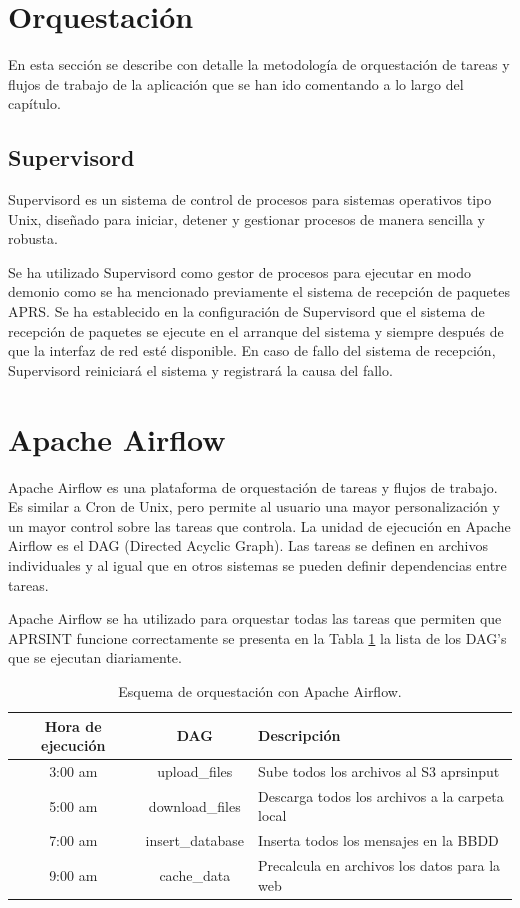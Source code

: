 \section{Orquestación}

En esta sección se describe con detalle la metodología de orquestación de tareas y flujos de trabajo de la aplicación que se han ido comentando a lo largo del capítulo.

\subsection{Supervisord}
Supervisord es un sistema de control de procesos para sistemas operativos tipo Unix, diseñado para iniciar, detener y gestionar procesos de manera sencilla y robusta.

Se ha utilizado Supervisord como gestor de procesos para ejecutar en modo demonio como se ha mencionado previamente el sistema de recepción de paquetes APRS. Se ha establecido en la configuración de Supervisord que el sistema de recepción de paquetes se ejecute en el arranque del sistema y siempre después de que la interfaz de red esté disponible. En caso de fallo del sistema de recepción, Supervisord reiniciará el sistema y registrará la causa del fallo.

\section{Apache Airflow}
Apache Airflow es una plataforma de orquestación de tareas y flujos de trabajo. Es similar a Cron de Unix, pero permite al usuario una mayor personalización y un mayor control sobre las tareas que controla. La unidad de ejecución en Apache Airflow es el DAG (Directed Acyclic Graph). Las tareas se definen en archivos individuales y al igual que en otros sistemas se pueden definir dependencias entre tareas.

Apache Airflow se ha utilizado para orquestar todas las tareas que permiten que APRSINT funcione correctamente se presenta en la Tabla \ref{tab:airflow-sched} la lista de los DAG's que se ejecutan diariamente.

\begin{table}[htbp]
	\centering
	\begin{tabular}{|c|c|m{5.5cm}|}
		\hline
		\textbf{Hora de ejecución} & \textbf{DAG} & \textbf{Descripción} \\
		\hline
		3:00 am & upload\_files & Sube todos los archivos al S3 aprsinput \\
		\hline
		5:00 am & download\_files & Descarga todos los archivos a la carpeta local \\
		\hline
		7:00 am  & insert\_database & Inserta todos los mensajes en la BBDD \\
		\hline
		9:00 am & cache\_data & Precalcula en archivos los datos para la web \\
		\hline
	\end{tabular}
	\caption{Esquema de orquestación con Apache Airflow.}
	\label{tab:airflow-sched}
\end{table}

